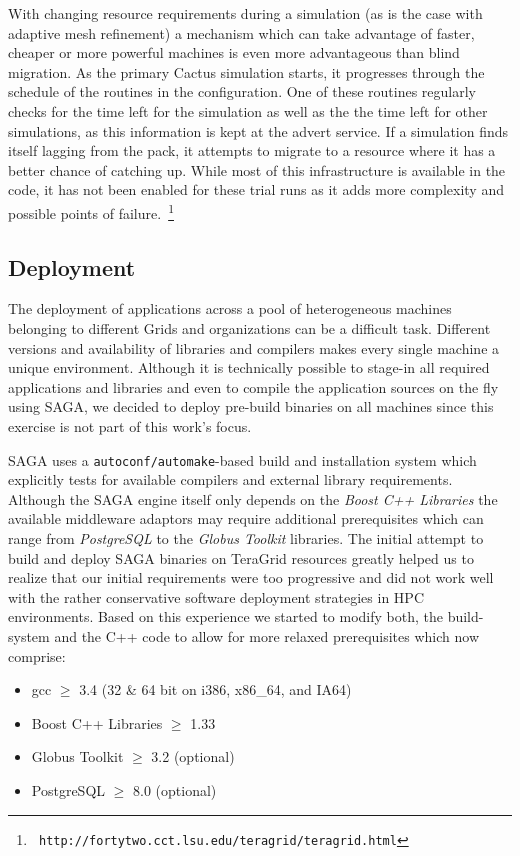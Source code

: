 \documentclass[conference,final]{IEEEtran}
\begin{document}
With changing resource requirements during a simulation (as is the
case with adaptive mesh refinement) a mechanism which can take
advantage of faster, cheaper or more powerful machines is even more
advantageous than blind migration. As the primary Cactus simulation
starts, it progresses through the schedule of the routines in the
configuration. One of these routines regularly checks for the time
left for the simulation as well as the the time left for other
simulations, as this information is kept at the advert service. If a
simulation finds itself lagging from the pack, it attempts to migrate
to a resource where it has a better chance of catching up. While most
of this infrastructure is available in the code, it has not been
enabled for these trial runs as it adds more complexity and possible
points of failure.~\footnote{\tt
  http://fortytwo.cct.lsu.edu/teragrid/teragrid.html}

\subsection{Deployment}

The deployment of applications across a pool of heterogeneous machines
belonging to different Grids and organizations can be a difficult
task. Different versions and availability of libraries and compilers
makes every single machine a unique environment. Although it is
technically possible to stage-in all required applications and
libraries and even to compile the application sources on the fly using
SAGA, we decided to deploy pre-build binaries on all machines since
this exercise is not part of this work's focus.

SAGA uses a \texttt{autoconf/automake}-based build and installation
system which explicitly tests for available compilers and external
library requirements.  Although the SAGA engine itself only depends on
the \textit{Boost C++ Libraries} the available middleware adaptors may
require additional prerequisites which can range from
\textit{PostgreSQL} to the \textit{Globus Toolkit} libraries. The
initial attempt to build and deploy SAGA binaries on TeraGrid
resources greatly helped us to realize that our initial requirements
were too progressive and did not work well with the rather
conservative software deployment strategies in HPC environments.
Based on this experience we started to modify both, the build-system
and the C++ code to allow for more relaxed prerequisites which now
comprise:

\begin{itemize}
\item{gcc $\geq$ 3.4 (32 \& 64 bit on i386, x86\_64, and IA64)}
\item{Boost C++ Libraries $\geq$ 1.33}
\item{Globus Toolkit $\geq$ 3.2 (optional)}
\item{PostgreSQL $\geq$ 8.0 (optional)}
\end{itemize}
\end{document}
